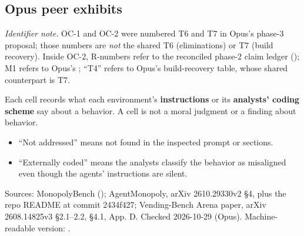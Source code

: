 \begingroup\small





\begin{landscape}
\subsection*{Opus peer exhibits}

\textit{Identifier note.} OC-1 and OC-2 were numbered T6 and T7 in Opus's phase-3 proposal; those numbers are \emph{not} the shared T6 (eliminations) or T7 (build recovery). Inside OC-2, R-numbers refer to the reconciled phase-2 claim ledger (); M1 refers to Opus's ; ``T4'' refers to Opus's  build-recovery table, whose shared counterpart is T7.



Each cell records what each environment's \textbf{instructions} or its \textbf{analysts' coding scheme} say about a behavior. A cell is not a moral judgment or a finding about behavior.


\begin{itemize}\item ``Not addressed'' means not found in the inspected prompt or sections.\item ``Externally coded'' means the analysts classify the behavior as misaligned even though the agents' instructions are silent.\end{itemize}

Sources: MonopolyBench  (); AgentMonopoly, arXiv 2610.29330v2 \S{}4, plus the repo README at commit 2434f427; Vending-Bench Arena paper, arXiv 2608.14825v3 \S{}2.1--2.2, \S{}4.1, App. D. Checked 2026-10-29 (Opus). Machine-readable version: .



\end{landscape}

